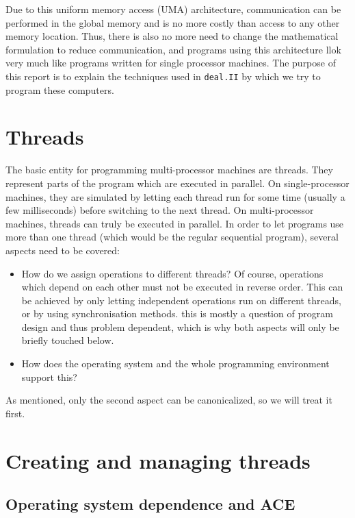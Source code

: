 \documentclass[11pt]{article}
\begin{document}
Due to this uniform memory access (UMA) architecture, communication can be
performed in the global memory and is no more costly than access to any other
memory location. Thus, there is also no more need to change the mathematical
formulation to reduce communication, and programs using this architecture llok
very much like programs written for single processor machines. The purpose of
this report is to explain the techniques used in \texttt{deal.II} by which we
try to program these computers.



\section{Threads}

The basic entity for programming multi-processor machines are threads. They
represent parts of the program which are executed in parallel. On
single-processor machines, they are simulated by letting each thread run for
some time (usually a few milliseconds) before switching to the next thread. On
multi-processor machines, threads can truly be executed in parallel. In order
to let programs use more than one thread (which would be the regular
sequential program), several aspects need to be covered:
\begin{itemize}
\item How do we assign operations to different threads? Of course, operations
  which depend on each other must not be executed in reverse order. This can
  be achieved by only letting independent operations run on different threads,
  or by using synchronisation methods. this is mostly a question of program
  design and thus problem dependent, which is why both aspects will only be
  briefly touched below.
\item How does the operating system and the whole programming environment
  support this?
\end{itemize}
As mentioned, only the second aspect can be canonicalized, so we will treat it
first.


\section{Creating and managing threads}

\subsection{Operating system dependence and ACE}
\end{document}
